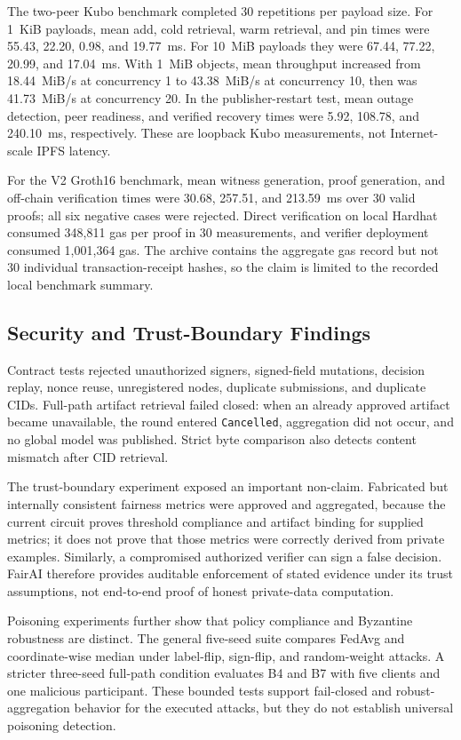 \documentclass[futureinternet,article,submit,pdftex,moreauthors]{Definitions/mdpi}
\begin{document}
The two-peer Kubo benchmark completed 30 repetitions per payload size. For 1~KiB payloads, mean add, cold retrieval, warm retrieval, and pin times were 55.43, 22.20, 0.98, and 19.77~ms. For 10~MiB payloads they were 67.44, 77.22, 20.99, and 17.04~ms. With 1~MiB objects, mean throughput increased from 18.44~MiB/s at concurrency 1 to 43.38~MiB/s at concurrency 10, then was 41.73~MiB/s at concurrency 20. In the publisher-restart test, mean outage detection, peer readiness, and verified recovery times were 5.92, 108.78, and 240.10~ms, respectively. These are loopback Kubo measurements, not Internet-scale IPFS latency.

For the V2 Groth16 benchmark, mean witness generation, proof generation, and off-chain verification times were 30.68, 257.51, and 213.59~ms over 30 valid proofs; all six negative cases were rejected. Direct verification on local Hardhat consumed 348,811 gas per proof in 30 measurements, and verifier deployment consumed 1,001,364 gas. The archive contains the aggregate gas record but not 30 individual transaction-receipt hashes, so the claim is limited to the recorded local benchmark summary.

\subsection{Security and Trust-Boundary Findings}

Contract tests rejected unauthorized signers, signed-field mutations, decision replay, nonce reuse, unregistered nodes, duplicate submissions, and duplicate CIDs. Full-path artifact retrieval failed closed: when an already approved artifact became unavailable, the round entered \texttt{Cancelled}, aggregation did not occur, and no global model was published. Strict byte comparison also detects content mismatch after CID retrieval.

The trust-boundary experiment exposed an important non-claim. Fabricated but internally consistent fairness metrics were approved and aggregated, because the current circuit proves threshold compliance and artifact binding for supplied metrics; it does not prove that those metrics were correctly derived from private examples. Similarly, a compromised authorized verifier can sign a false decision. FairAI therefore provides auditable enforcement of stated evidence under its trust assumptions, not end-to-end proof of honest private-data computation.

Poisoning experiments further show that policy compliance and Byzantine robustness are distinct. The general five-seed suite compares FedAvg and coordinate-wise median under label-flip, sign-flip, and random-weight attacks. A stricter three-seed full-path condition evaluates B4 and B7 with five clients and one malicious participant. These bounded tests support fail-closed and robust-aggregation behavior for the executed attacks, but they do not establish universal poisoning detection.
\end{document}
